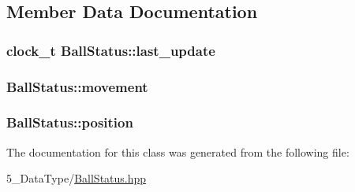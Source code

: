 \subsection{Member Data Documentation}
\subsubsection[{\texorpdfstring{last\+\_\+update}{last_update}}]{\setlength{\rightskip}{0pt plus 5cm}clock\+\_\+t Ball\+Status\+::last\+\_\+update}\hypertarget{class_ball_status_a8a53c0c35e7179f0af564142f9cccf1c}{}\label{class_ball_status_a8a53c0c35e7179f0af564142f9cccf1c}
\subsubsection[{\texorpdfstring{movement}{movement}}]{ Ball\+Status\+::movement}\hypertarget{class_ball_status_a8dce8cc463cb99e8bc8a02d8dd880e21}{}\label{class_ball_status_a8dce8cc463cb99e8bc8a02d8dd880e21}
\subsubsection[{\texorpdfstring{position}{position}}]{ Ball\+Status\+::position}\hypertarget{class_ball_status_a7d841e95314cf93e4afbc894288a992b}{}\label{class_ball_status_a7d841e95314cf93e4afbc894288a992b}


The documentation for this class was generated from the following file\+:\begin{DoxyCompactItemize}
\item 
5\+\_\+\+Data\+Type/\hyperlink{_ball_status_8hpp}{Ball\+Status.\+hpp}\end{DoxyCompactItemize}

